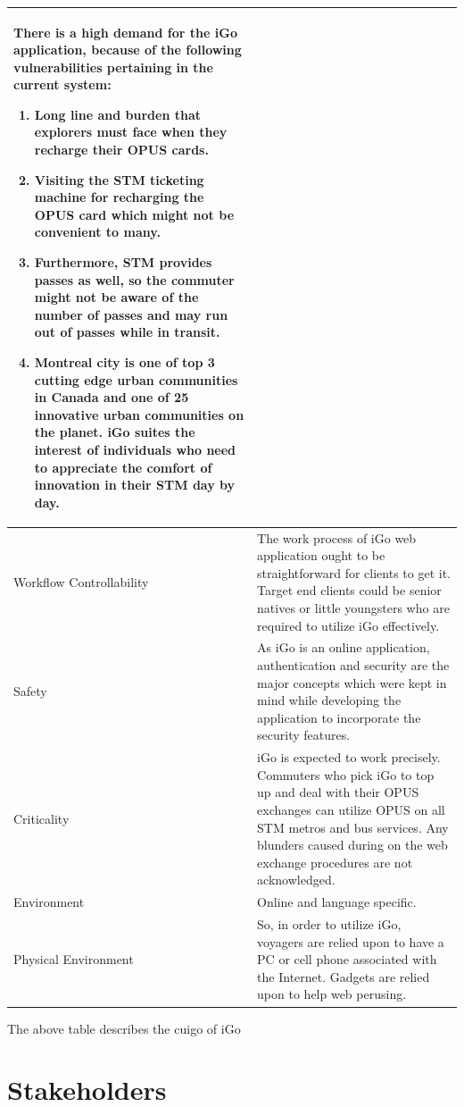 \documentclass[11pt, english]{report}
\begin{document}
\begin{longtable}[!htbp]{ |p{3cm}|p{12cm}| }
There is a high demand for the iGo application, because of the following vulnerabilities pertaining in the current system: 
\begin{enumerate}
    \item Long line and burden that explorers must face when they recharge their OPUS cards. \item Visiting the STM ticketing machine for recharging the OPUS card which might not be convenient to many.
    \item Furthermore, STM provides passes as well, so the commuter might not be aware of the number of passes and may run out of passes while in transit.
    \item  Montreal city is one of top 3 cutting edge urban communities in Canada and one of 25 innovative urban communities on the planet. iGo suites the interest of individuals who need to appreciate the comfort of innovation in their STM day by day.\cite{tech_city}
\end{enumerate} \\
\hline 

Workflow Controllability & 

The work process of iGo web application ought to be straightforward for clients to get it. Target end clients could be senior natives or little youngsters who are required to utilize iGo effectively.\\
\hline
Safety & 
As iGo is an online application, authentication and security are the major concepts which were kept in mind while developing the application to incorporate the security features.\\
\hline
Criticality & 
iGo is expected to work precisely. Commuters who pick iGo to top up and deal with their OPUS exchanges can utilize OPUS on all STM metros and bus services. Any blunders caused during on the web exchange procedures are not acknowledged.\\
\hline
Environment & Online and language specific.\\
\hline
Physical Environment & 
So, in order to utilize iGo, voyagers are relied upon to have a PC or cell phone associated with the Internet. Gadgets are relied upon to help web perusing.\\
\hline
\end{longtable}
\vspace*{0.1in}
The above table describes the \gls{cuigo} of iGo\\




\section{Stakeholders}
\end{document}
